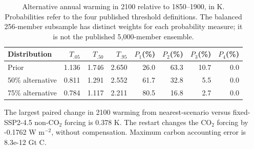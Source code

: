 \begin{table}[htbp]
\centering\small
\begin{tabular}{lrrrrrrr}
\toprule
Distribution & $T_{.05}$ & $T_{.50}$ & $T_{.95}$ & $P_1$(\%) & $P_2$(\%) & $P_3$(\%) & $P_4$(\%) \\
\midrule
Prior & 1.136 & 1.746 & 2.650 & 26.0 & 63.3 & 10.7 & 0.0 \\
50\% alternative & 0.811 & 1.291 & 2.552 & 61.7 & 32.8 & 5.5 & 0.0 \\
75\% alternative & 0.784 & 1.117 & 2.211 & 80.5 & 16.8 & 2.7 & 0.0 \\
\bottomrule\end{tabular}
\caption{Alternative annual warming in 2100 relative to 1850--1900, in K. Probabilities refer to the four published threshold definitions. The balanced 256-member subsample has distinct weights for each probability measure; it is not the published 5,000-member ensemble.}
\end{table}
The largest paired change in 2100 warming from nearest-scenario versus fixed-SSP2-4.5 non-CO$_2$ forcing is 0.378 K. The restart changes the CO$_2$ forcing by -0.1762 W m$^{-2}$, without compensation. Maximum carbon accounting error is 8.3e-12 Gt C.
